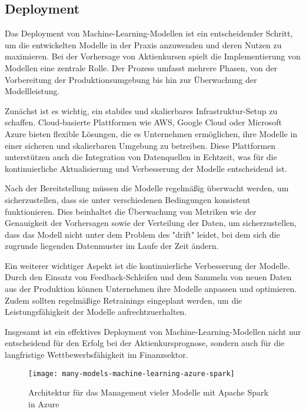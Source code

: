 \newpage
\subsection{Deployment}\label{sec:modellierung}

Das Deployment von Machine-Learning-Modellen ist ein entscheidender Schritt, um die entwickelten Modelle in der Praxis anzuwenden und deren Nutzen zu maximieren. Bei der Vorhersage von Aktienkursen spielt die Implementierung von Modellen eine zentrale Rolle. Der Prozess umfasst mehrere Phasen, von der Vorbereitung der Produktionsumgebung bis hin zur Überwachung der Modellleistung.

Zunächst ist es wichtig, ein stabiles und skalierbares Infrastruktur-Setup zu schaffen. Cloud-basierte Plattformen wie AWS, Google Cloud oder Microsoft Azure bieten flexible Lösungen, die es Unternehmen ermöglichen, ihre Modelle in einer sicheren und skalierbaren Umgebung zu betreiben. Diese Plattformen unterstützen auch die Integration von Datenquellen in Echtzeit, was für die kontinuierliche Aktualisierung und Verbesserung der Modelle entscheidend ist.

Nach der Bereitstellung müssen die Modelle regelmäßig überwacht werden, um sicherzustellen, dass sie unter verschiedenen Bedingungen konsistent funktionieren. Dies beinhaltet die Überwachung von Metriken wie der Genauigkeit der Vorhersagen sowie der Verteilung der Daten, um sicherzustellen, dass das Modell nicht unter dem Problem des "drift" leidet, bei dem sich die zugrunde liegenden Datenmuster im Laufe der Zeit ändern.

Ein weiterer wichtiger Aspekt ist die kontinuierliche Verbesserung der Modelle. Durch den Einsatz von Feedback-Schleifen und dem Sammeln von neuen Daten aus der Produktion können Unternehmen ihre Modelle anpassen und optimieren. Zudem sollten regelmäßige Retrainings eingeplant werden, um die Leistungsfähigkeit der Modelle aufrechtzuerhalten.

Insgesamt ist ein effektives Deployment von Machine-Learning-Modellen nicht nur entscheidend für den Erfolg bei der Aktienkursprognose, sondern auch für die langfristige Wettbewerbsfähigkeit im Finanzsektor.

\begin{figure}[h]
	\centering
	\texttt{[image: many-models-machine-learning-azure-spark]}
	\caption{Architektur für das Management vieler Modelle mit Apache Spark in Azure}
	\label{fig:ml_deployment_architecture}
\end{figure}

\autocite{mason2018machine}
\autocite{chen2019model}
\cite{microsoft2020}








